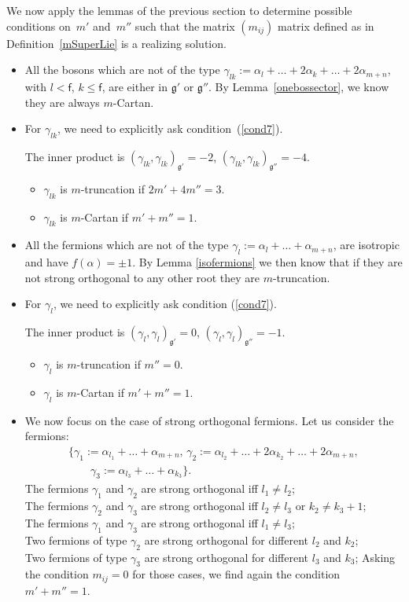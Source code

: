 \documentclass[pdftex]{sigma}%
\numberwithin{equation}{section}
\newcommand{\g}{\mathfrak{g}}
\newcommand{\f}{\mathsf{f}}
\begin{document}
We now apply the lemmas of the previous section to determine possible conditions on~$m'$ and~$m''$ such that the matrix $(m_{ij})$ matrix defined as in Definition~\ref{mSuperLie} is a realizing solution.
\begin{itemize}\itemsep=0pt
	\item All the bosons which are not of the type $\gamma_{lk}:= \alpha_l+ \dots +2\alpha_{k}+\dots +2\alpha_{m+n}$, with $l < \f$, $k\leq \f$, are either in $\mathfrak{g'}$ or $\mathfrak{g''}$. By Lemma~\ref{onebossector}, we know they are always $m$-Cartan.
	\item For $\gamma_{lk}$, we need to explicitly ask condition~(\ref{cond7}).

The inner product is $(\gamma_{lk},\gamma_{lk})_{\g'}= -2$, $(\gamma_{lk},\gamma_{lk})_{\g''}= -4$.
	\begin{itemize}\itemsep=0pt
	\item $\gamma_{lk}$ is $m$-truncation if $2m' +4m'' =3$.
	\item $\gamma_{lk}$ is $m$-Cartan if $m'+m'' = 1$.
	\end{itemize}
	\item All the fermions which are not of the type $\gamma_{l}:= \alpha_l+ \dots +\alpha_{m+n}$, are isotropic and have $f(\alpha)= \pm 1$. By Lemma \ref{isofermions} we then know that if they are not strong orthogonal to any other root they are $m$-truncation.
	\item For $\gamma_{l}$, we need to explicitly ask condition (\ref{cond7}).

The inner product is $(\gamma_{l},\gamma_{l})_{\g'}=0$, $(\gamma_{l},\gamma_{l})_{\g''}= -1$.
	\begin{itemize}\itemsep=0pt
	\item $\gamma_{l}$ is $m$-truncation if $m'' =0$.
	\item $\gamma_{l}$ is $m$-Cartan if $m'+m'' = 1$.
	\end{itemize}
\item We now focus on the case of strong orthogonal fermions. Let us consider the fermions:
\begin{gather*} \big\lbrace \gamma_1 := \alpha_{l_1}+ \dots +\alpha_{m+n},\,
 \gamma_2:=\alpha_{l_2}+ \dots +2\alpha_{k_2}+\dots +2\alpha_{m+n},\\
 \qquad
  \gamma_3:= \alpha_{l_3}+ \dots +\alpha_{k_3} \big\rbrace.			
\end{gather*}
	The fermions $\gamma_1$ and $\gamma_2$ are strong orthogonal iff $l_1\neq l_2$;\\
	The fermions $\gamma_2$ and $\gamma_3$ are strong orthogonal iff $l_2\neq l_3$ or $k_2\neq k_3+1$;\\
	The fermions $\gamma_1$ and $\gamma_3$ are strong orthogonal iff $l_1\neq l_3$;\\
	Two fermions of type $\gamma_2$ are strong orthogonal for different $l_2$ and $k_2$;\\
	Two fermions of type $\gamma_3$ are strong orthogonal for different $l_3$ and $k_3$;
	Asking the condition $m_{ij}=0$ for those cases, we find again the condition $m'+m''=1$.
\end{itemize}		
\end{document}
